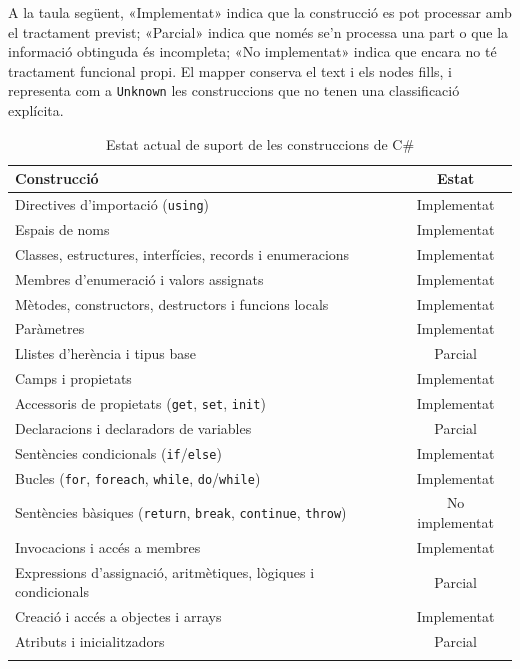 A la taula següent, «Implementat» indica que la construcció es pot processar amb el tractament previst; «Parcial» indica que només se'n processa una part o que la informació obtinguda és incompleta; «No implementat» indica que encara no té tractament funcional propi. El mapper conserva el text i els nodes fills, i representa com a \texttt{Unknown} les construccions que no tenen una classificació explícita.

\begin{table}[H]
    \centering
    \label{tab:csharp-support}
    \begin{tabularx}{\textwidth}{X c}
        \hline
        \textbf{Construcció} & \textbf{Estat} \\
        \hline
        Directives d'importació (\texttt{using}) & Implementat \\
        Espais de noms & Implementat \\
        Classes, estructures, interfícies, records i enumeracions & Implementat \\
        Membres d'enumeració i valors assignats & Implementat \\
        Mètodes, constructors, destructors i funcions locals & Implementat \\
        Paràmetres & Implementat \\
        Llistes d'herència i tipus base & Parcial \\
        Camps i propietats & Implementat \\
        Accessoris de propietats (\texttt{get}, \texttt{set}, \texttt{init}) & Implementat \\
        Declaracions i declaradors de variables & Parcial \\
        Sentències condicionals (\texttt{if}/\texttt{else}) & Implementat \\
        Bucles (\texttt{for}, \texttt{foreach}, \texttt{while}, \texttt{do}/\texttt{while}) & Implementat \\
        Sentències bàsiques (\texttt{return}, \texttt{break}, \texttt{continue}, \texttt{throw}) & No implementat \\
        Invocacions i accés a membres & Implementat \\
        Expressions d'assignació, aritmètiques, lògiques i condicionals & Parcial \\
        Creació i accés a objectes i arrays & Implementat \\
        Atributs i inicialitzadors & Parcial \\
        \hline
        \caption{Estat actual de suport de les construccions de C\#}
    \end{tabularx}
\end{table}

